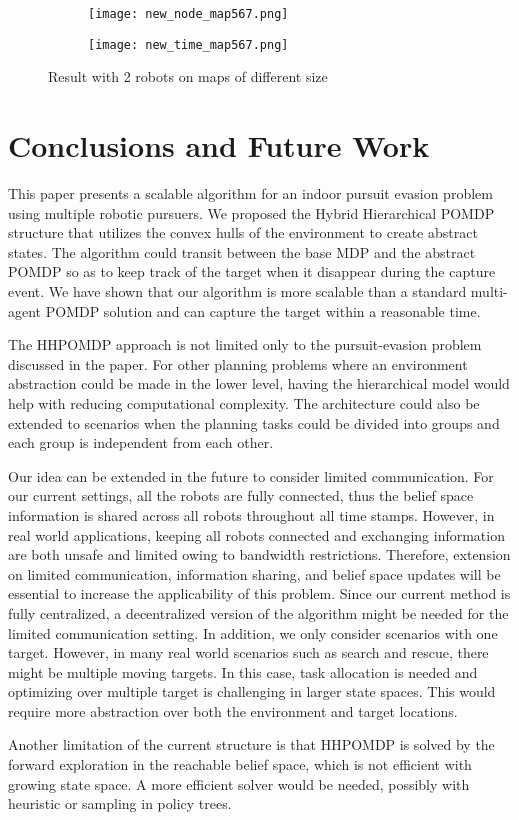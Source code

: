 \documentclass[../main.tex]{subfiles}
\begin{document}
\begin{figure}%
\captionsetup{skip=0pt}
    \centering
    \begin{subfigure}[b]{0.48\textwidth}
        \centering
        \texttt{[image: new\_node\_map567.png]}
        \caption{}
        \label{fig:node_map456}
    \end{subfigure}
    \begin{subfigure}[b]{0.48\textwidth}
        \centering
        \texttt{[image: new\_time\_map567.png]}
        \caption{ }
        \label{fig:time_map456}
    \end{subfigure}
    \caption{Result with 2 robots on maps of different size}
    \label{fig:map456_r2}%
\end{figure}

\section{Conclusions and Future Work}
This paper presents a scalable algorithm for an indoor pursuit evasion problem using multiple robotic pursuers. We proposed the Hybrid Hierarchical POMDP structure that utilizes the convex hulls of the environment to create abstract states. The algorithm could transit between the base MDP and the abstract POMDP so as to keep track of the target when it disappear during the capture event. We have shown that our algorithm is more scalable than a standard multi-agent POMDP solution and can capture the target within a reasonable time.

The HHPOMDP approach is not limited only to the pursuit-evasion problem discussed in the paper. For other planning problems where an environment abstraction could be made in the lower level, having the hierarchical model would help with reducing computational complexity. The architecture could also be extended to scenarios when the planning tasks could be divided into groups and each group is independent from each other.

Our idea can be extended in the future to consider limited communication. For our current settings, all the robots are fully connected, thus the belief space information is shared across all robots throughout all time stamps. However, in real world applications, keeping all robots connected and exchanging information are both unsafe and limited owing to bandwidth restrictions. Therefore, extension on limited communication, information sharing, and belief space updates will be essential to increase the applicability of this problem. Since our current method is fully centralized, a decentralized version of the algorithm might be needed for the limited communication setting. In addition, we only consider scenarios with one target. However, in many real world scenarios such as search and rescue, there might be multiple moving targets. In this case, task allocation is needed and optimizing over multiple target is challenging in larger state spaces. This would require more abstraction over both the environment and target locations.  

Another limitation of the current structure is that HHPOMDP is solved by the forward exploration in the reachable belief space, which is not efficient with growing state space. A more efficient solver would be needed, possibly with heuristic or sampling in policy trees.
\end{document}
